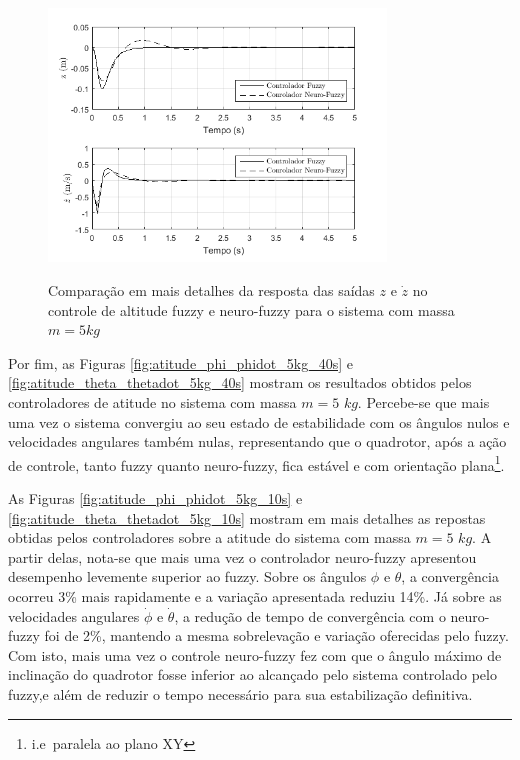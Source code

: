 \begin{figure}[!htb]
    \centering
    \caption{Comparação em mais detalhes da resposta das saídas $z$ e $\dot{z}$ no controle de altitude fuzzy e neuro-fuzzy para o sistema com massa $m=5kg$}
    \includegraphics[width=0.8\textwidth]{./04-figuras/resultados/novos/altitude_z_zdot_5kg_closer}
    \label{fig:altitude_z_zdot_5kg_closer}
\end{figure}



Por fim, as Figuras \ref{fig:atitude_phi_phidot_5kg_40s} e \ref{fig:atitude_theta_thetadot_5kg_40s} mostram os resultados obtidos pelos controladores de atitude no sistema com massa $m=5$ $kg$. Percebe-se que mais uma vez o sistema convergiu ao seu estado de estabilidade com os ângulos nulos e velocidades angulares também nulas, representando que o quadrotor, após a ação de controle, tanto fuzzy quanto neuro-fuzzy, fica estável e com orientação plana\footnote{i.e\ paralela ao plano XY}.

As Figuras \ref{fig:atitude_phi_phidot_5kg_10s} e \ref{fig:atitude_theta_thetadot_5kg_10s} mostram em mais detalhes as repostas obtidas pelos controladores sobre a atitude do sistema com massa $m=5$ $kg$. A partir delas, nota-se que mais uma vez o controlador neuro-fuzzy apresentou desempenho levemente superior ao fuzzy. Sobre os ângulos $\phi$ e $\theta$, a convergência ocorreu 3\% mais rapidamente e a variação apresentada reduziu 14\%. Já sobre as velocidades angulares $\dot{\phi}$ e $\dot{\theta}$, a redução de tempo de convergência com o neuro-fuzzy foi de 2\%, mantendo a mesma sobrelevação e variação oferecidas pelo fuzzy. Com isto, mais uma vez o controle neuro-fuzzy fez com que o ângulo máximo de inclinação do quadrotor fosse inferior ao alcançado pelo sistema controlado pelo fuzzy,e além de reduzir o tempo necessário para sua estabilização definitiva.

